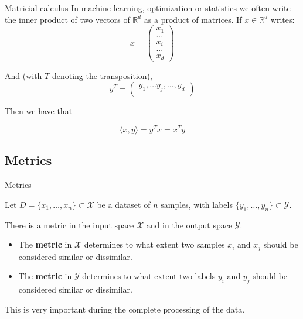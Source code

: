 \documentclass[usenames,dvipsnames]{beamer}
\begin{document}
\begin{frame}{Matricial calculus}
In machine learning, optimization or statistics we often write the inner product of two vectors of $ \mathbb{R}^d$ as a product of matrices. If $x\in \mathbb{R}^d$ writes:
\begin{equation*}
x=\begin{pmatrix}
x_{1}\\
...\\
x_{i}\\
...\\
x_{d}
\end{pmatrix}
\end{equation*}

And (with $T$ denoting the transposition),
\begin{equation*}
y^T=\begin{pmatrix}
y_{1}, \dots y_j, \dots, y_d\\
\end{pmatrix}
\end{equation*}

Then we have that

\begin{equation*}
    \langle x, y \rangle = y^Tx=x^Ty
\end{equation*}
\end{frame}

\subsection{Metrics}

\begin{frame}{Metrics}

    Let $D = \{x_1, \dots, x_n\}\subset \mathcal{X} $ be a dataset of $n$ samples, with labels $\{y_1, \dots, y_n\} \subset \mathcal{Y}$.

    There is a metric in the input space $ \mathcal{X}$ and in the output space $ \mathcal{Y}$.
    \begin{itemize}
    	\item The \textbf{metric} in $ \mathcal{X}$ determines to what extent two samples $x_i$ and $x_j$ should be considered similar or dissimilar.
	\item The \textbf{metric} in $ \mathcal{Y}$ determines to what extent two labels $y_i$ and $y_j$ should be considered similar or dissimilar.
    \end{itemize}

    This is very important during the complete processing of the data.
\end{frame}
\end{document}
